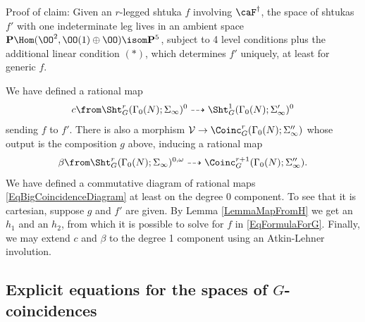 \documentclass{article}
\def\P{\mathbf{P}}
\begin{document}
Proof of claim:  Given an $r$-legged shtuka $f$ involving $\caF^\dagger$, the space of shtukas $f'$ with one indeterminate leg lives in an ambient space $\P\Hom(\OO^2,\OO(1)\oplus\OO)\isom \P^5$, subject to 4 level conditions plus the additional linear condition $(\ast)$, which determines $f'$ uniquely, at least for generic $f$.  

We have defined a rational map
\[ c\from \Sht^r_G(\Gamma_0(N);\Sigma_\infty)^0 \dashrightarrow \Sht_G^1(\Gamma_0(N);\Sigma_\infty')^0\]
sending $f$ to $f'$.  There is also a morphism $\mathcal{V}\to \Coinc_G^r(\Gamma_0(N);\Sigma_\infty'')$ whose output is the composition $g$ above, inducing a rational map 
\[ \beta\from \Sht^r_G(\Gamma_0(N);\Sigma_\infty)^{0,\omega}\dashrightarrow \Coinc^{r+1}_G(\Gamma_0(N);\Sigma_\infty''). \]
We have defined a commutative diagram of rational maps \eqref{EqBigCoincidenceDiagram} at least on the degree 0 component.  To see that it is cartesian, suppose $g$ and $f'$ are given.  By Lemma \ref{LemmaMapFromH} we get an $h_1$ and an $h_2$, from which it is possible to solve for $f$ in \eqref{EqFormulaForG}. Finally, we may extend $c$ and $\beta$ to the degree 1 component using an Atkin-Lehner involution.


\subsection{Explicit equations for the spaces of $G$-coincidences} 
\end{document}
